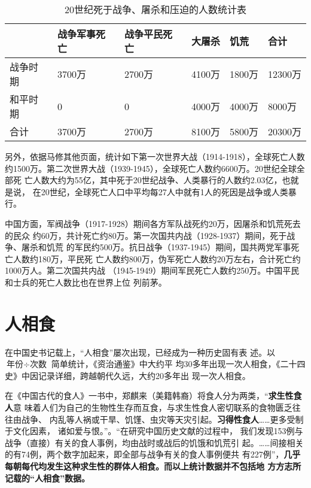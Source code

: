 \begin{table}[h] \centering
  \begin{tabular}{@{}llllll@{}}
    \toprule & 战争军事死亡 & 战争平民死亡 & 大屠杀 & 饥荒 & 合计 \\ \midrule
    战争时期 & 3700万 & 2700万 & 4100万 & 1800万 & 12300万 \\
    和平时期 & 0 & 0 & 4000万 & 4000万 & 8000万 \\
    合计 & 3700万 & 2700万 & 8100万 & 5800万 & 20300万 \\ \bottomrule
  \end{tabular}
  \caption{20世纪死于战争、屠杀和压迫的人数统计表}
  \label{tab:20stdied}
\end{table}

另外，依据马修其他页面，统计如下第一次世界大战（1914-1918），全球死亡人数
约1500万。第二次世界大战（1939-1945），全球死亡人数约6600万。20世纪全球全部死
亡人数大约为55亿，其中死于20世纪战争、人类暴行的人数约2.03亿，也就是说，
在20世纪，全球死亡人口中平均每27人中就有1人的死因是战争或人类暴行。

中国方面，军阀战争（1917-1928）期间各方军队战死约20万，因屠杀和饥荒死去的民众
约60万，共计死亡约80万。第一次国共内战（1928-1937）期间，死于战争、屠杀和饥荒
的军民约500万。抗日战争（1937-1945）期间，国共两党军事死亡人数约180万，平民死
亡人数约800万，伪军死亡人数约20万左右，合计死亡约1000万人。第二次国共内战
（1945-1949）期间军民死亡人数约250万。中国平民和士兵的死亡人数比也在世界上位
列前茅。

\section{人相食}

在中国史书记载上，“人相食”屡次出现，已经成为一种历史固有表
述\cite{renxiangshi}。以 $ \mbox{年份} \div \mbox{次数} $ 简单统计，《资治通鉴》中大约平
均30多年出现一次人相食，《二十四史》中因记录详细，跨越朝代久远，大约20多年出
现一次人相食。

在《中国古代的食人》一书中，郑麒来（美籍韩裔）将食人分为两类，“\textbf{求生性食人}意
味着人们为自己的生物性生存而互食，与求生性食人密切联系的食物匮乏往往由战争、
内乱等人祸或干旱、饥馑、虫灾等天灾引起。\textbf{习得性食人}……更多受制于文化因素，
诸如爱与恨。”。“在研究中国历史文献的过程中，
我们发现153例与战争（直接）有关的食人事例，均由战时或战后的饥饿和饥荒引
起。……间接相关的有74例，两个数字加起来，即全部与战争有关的食人事例便共
有227例”，\textbf{几乎每朝每代均发生这种求生性的群体人相食。而以上统计数据并不包括地
方方志所记载的“人相食”数据。}


